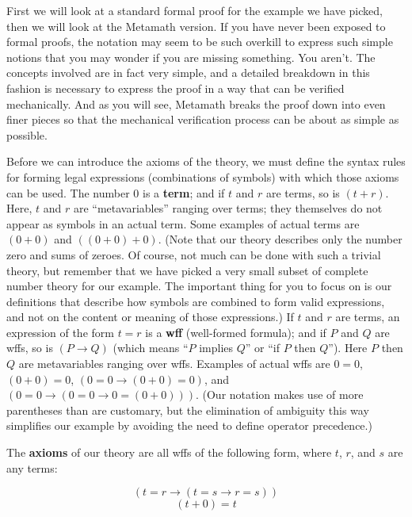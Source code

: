 First we will look at a standard formal proof for the
example we have picked, then we will look at the Metamath version.  If you
have never been exposed to formal proofs, the notation may seem to be such
overkill to express such simple notions that you may wonder if you are missing
something.  You aren't.  The concepts involved are in fact very simple, and a
detailed breakdown in this fashion is necessary to express the proof in a way
that can be verified mechanically.  And as you will see, Metamath breaks the
proof down into even finer pieces so that the mechanical verification process
can be about as simple as possible.

Before we can introduce the axioms of the theory, we must define
the syntax rules for forming legal expressions
(combinations of symbols) with which those axioms can be used. The number 0 is
a {\bf term}; and if $ t$ and $r$ are terms, so is $(t+r)$. Here,
$ t$ and $r$ are ``metavariables'' ranging over terms; they
themselves do not appear as symbols in an actual term.  Some examples of
actual terms are $(0 + 0)$ and $((0+0)+0)$.  (Note that our theory describes
only the number zero and sums of zeroes.  Of course, not much can be done with
such a trivial theory, but remember that we have picked a very small subset of
complete number theory for our example.  The important thing for you to focus
on is our definitions that describe how symbols are combined to form valid
expressions, and not on the content or meaning of those expressions.) If $ t$
and $r$ are terms, an expression of the form $ t=r$ is a {\bf wff}
(well-formed formula); and if $P$ and $Q$ are
wffs, so is $(P\rightarrow Q)$ (which means ``$P$ implies
$Q$'' or ``if $P$ then $Q$'').
Here $P$ then $Q$ are metavariables ranging over wffs.  Examples of actual
wffs are $0=0$, $(0+0)=0$, $(0=0 \rightarrow (0+0)=0)$, and $(0=0\rightarrow
(0=0\rightarrow 0=(0+0)))$.  (Our notation makes use of more parentheses than
are customary, but the elimination of ambiguity this way simplifies our
example by avoiding the need to define operator precedence.)

The {\bf axioms} of our theory are all wffs of the following
form, where $ t$, $r$, and $s$ are any terms:

\renewcommand{\theequation}{A\arabic{equation}}

\begin{equation}
(t=r\rightarrow (t=s\rightarrow r=s))
\end{equation}
\begin{equation}
(t+0)=t
\end{equation}

